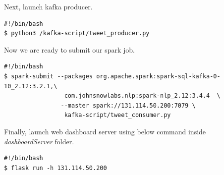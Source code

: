\documentclass[12pt,a4paper]{report}
\begin{document}
Next, launch kafka producer.

\begin{verbatim}
#!/bin/bash
$ python3 /kafka-script/tweet_producer.py 
\end{verbatim}

Now we are ready to submit our spark job.

\begin{verbatim}
#!/bin/bash
$ spark-submit --packages org.apache.spark:spark-sql-kafka-0-10_2.12:3.2.1,\
                 com.johnsnowlabs.nlp:spark-nlp_2.12:3.4.4  \
                --master spark://131.114.50.200:7079 \ 
                 kafka-script/tweet_consumer.py 
\end{verbatim}

Finally, launch web dashboard server using below command inside \textit{dashboardServer} folder.

\begin{verbatim}
#!/bin/bash
$ flask run -h 131.114.50.200 
\end{verbatim}

\medskip
\printbibliography
\end{document}
